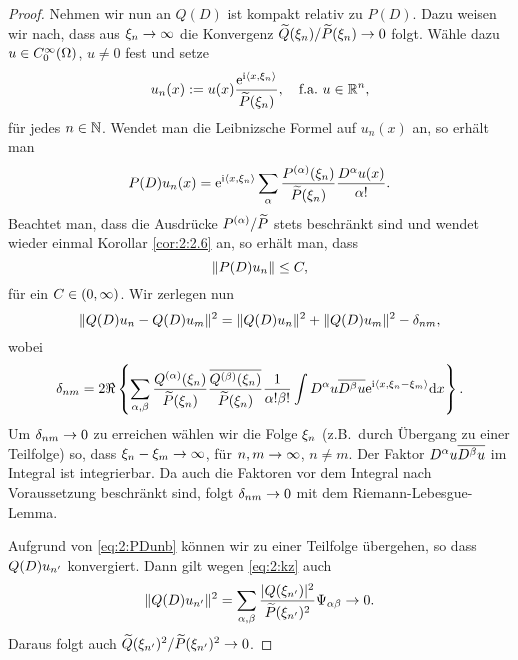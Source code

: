 \begin{proof}
Nehmen wir nun an $Q(D)$ ist kompakt relativ zu $P(D)$.
Dazu weisen wir nach, dass aus $\xi_n\to\infty$ die Konvergenz $\widetilde{Q}(\xi_n)/\widetilde{P}(\xi_n)\to0$ folgt.
Wähle dazu $u\in C^\infty_0(\Omega)$, $u\neq0$ fest und setze
\begin{equation}
u_n(x):=u(x)\frac{\mathrm e^{\mathrm i\langle x,\xi_n\rangle}}{\widetilde{P}(\xi_n)},\quad\text{f.a.}~u\in\mathbb R^n,
\end{equation}
für jedes $n\in\mathbb N$.
Wendet man die Leibnizsche Formel auf $u_n(x)$ an,
so erhält man
\begin{equation}
P(D)u_n(x)=\mathrm e^{\mathrm i\langle x,\xi_n\rangle}\sum_\alpha\frac{P^{(\alpha)}(\xi_n)}{\widetilde{P}(\xi_n)}\frac{D^\alpha u(x)}{\alpha!}.
\end{equation}
Beachtet man, dass die Ausdrücke $P^{(\alpha)}/\widetilde{P}$ stets beschränkt sind
und wendet wieder einmal Korollar \ref{cor:2:2.6} an,
so erhält man, dass
\begin{equation}\label{eq:2:PDunb}
\lVert P(D)u_n\rVert\leq C,
\end{equation}
für ein $C\in(0,\infty)$.
Wir zerlegen nun
\begin{equation}\label{eq:2:kz}
\lVert Q(D)u_n-Q(D)u_m\rVert^2=\lVert Q(D)u_n\rVert^2+\lVert Q(D)u_m\rVert^2-\delta_{nm},
\end{equation}
wobei
\begin{equation}
\delta_{nm}=2\Re\left\{\sum_{\alpha,\beta}\frac{Q^{(\alpha)}(\xi_n)}{\widetilde{P}(\xi_n)}\frac{\overline{Q^{(\beta)}(\xi_n)}}{\widetilde{P}(\xi_n)}
\frac1{\alpha!\beta!}\int D^\alpha u\overline{D^\beta u}\mathrm e^{\mathrm i\langle x,\xi_n-\xi_m\rangle}\mathrm{d} x\right\}.
\end{equation}
Um $\delta_{nm}\to0$ zu erreichen wählen wir die Folge $\xi_n$ (z.B.~durch Übergang zu einer Teilfolge) so,
dass $\xi_n-\xi_m\to\infty$, für $n,m\to\infty$, $n\neq m$.
Der Faktor $D^\alpha u\overline{D^\beta u}$ im Integral ist integrierbar.
Da auch die Faktoren vor dem Integral nach Voraussetzung beschränkt sind,
folgt $\delta_{nm}\to0$ mit dem Riemann-Lebesgue-Lemma.

Aufgrund von \eqref{eq:2:PDunb} können wir zu einer Teilfolge übergehen,
so dass $Q(D)u_{n^\prime}$ konvergiert.
Dann gilt wegen \eqref{eq:2:kz} auch
\begin{equation}
\lVert Q(D)u_{n^\prime}\rVert^2=\sum_{\alpha,\beta}\frac{\lvert Q(\xi_{n^\prime})\rvert^2}{\widetilde{P}(\xi_{n^\prime})^2}\Psi_{\alpha\beta}\to0.
\end{equation}
Daraus folgt auch $\widetilde{Q}(\xi_{n^\prime})^2/\widetilde{P}(\xi_{n^\prime})^2\to0$.
\end{proof}
